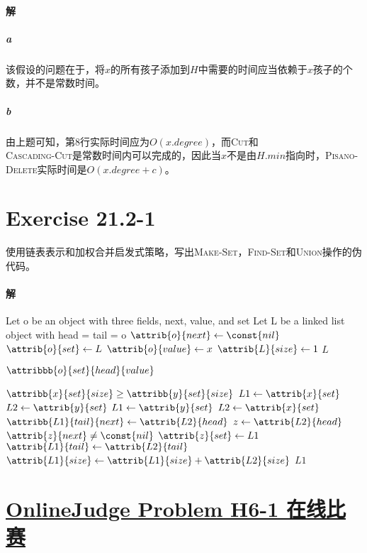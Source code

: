 \documentclass{article}
\begin{document}
\paragraph{解}
\subparagraph*{a}
该假设的问题在于，将$x$的所有孩子添加到$H$中需要的时间应当依赖于$x$孩子的个数，并不是常数时间。
\subparagraph*{b}
由上题可知，第8行实际时间应为$O(x.degree)$，而\textsc{Cut}和\\
\textsc{Cascading-Cut}是常数时间内可以完成的，因此当$x$不是由$H.min$指向时，\textsc{Pisano-Delete}实际时间是$O(x.degree+c)$。

\section{Exercise 21.2-1}
使用链表表示和加权合并启发式策略，写出\textsc{Make-Set}，\textsc{Find-Set}和\textsc{Union}操作的伪代码。

\paragraph{解}
\begin{codebox}
\li	Let o be an object with three fields, next, value, and set
\li	Let L be a linked list object with head = tail = o
\li $\attrib{o}{next} \gets \const{nil}$
\li $\attrib{o}{set} \gets L$
\li $\attrib{o}{value} \gets x$
\li	$\attrib{L}{size} \gets 1$
\li \Return $L$
\end{codebox}

\begin{codebox}
\li	\Return $\attribbb{o}{set}{head}{value}$
\end{codebox}

\begin{codebox}
\li \If $\attribb{x}{set}{size} \geq \attribb{y}{set}{size}$ \Then
\li 	$L1 \gets \attrib{x}{set}$
\li 	$L2 \gets \attrib{y}{set}$
\li	\Else
\li 	$L1 \gets \attrib{y}{set}$
\li 	$L2 \gets \attrib{x}{set}$
	\End
\li	$\attribb{L1}{tail}{next} \gets \attrib{L2}{head}$
\li $z \gets \attrib{L2}{head}$
\li \While $\attrib{z}{next} \neq \const{nil}$
	\Do
\li		$\attrib{z}{set} \gets L1$
	\End
\li	$\attrib{L1}{tail} \gets \attrib{L2}{tail}$
\li $\attrib{L1}{size} \gets \attrib{L1}{size} + \attrib{L2}{size}$
\li \Return $L1$
\end{codebox}
\section{\href{https://202.38.86.171/problem/H6-1}{OnlineJudge Problem H6-1 在线比赛}}
\end{document}
